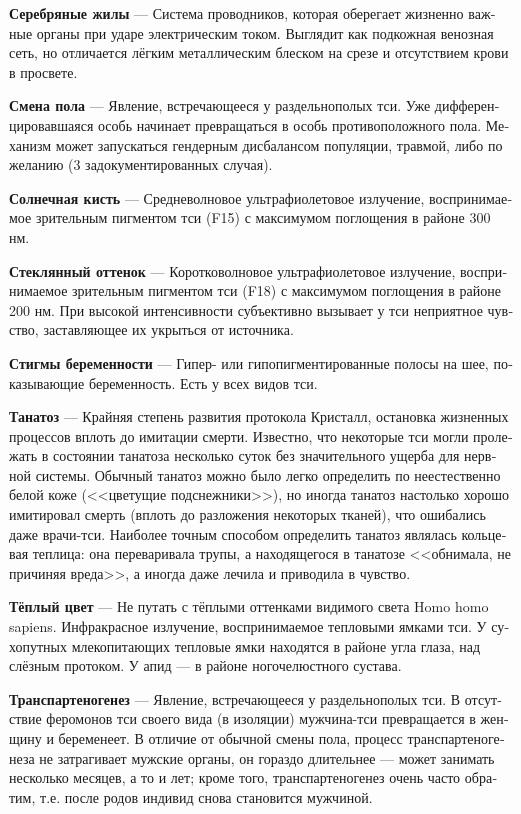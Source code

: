 \documentclass[a4paper,12pt,fleqn]{book}\usepackage{polyglossia}\setdefaultlanguage[babelshorthands=true]{russian}\setotherlanguage{english}\defaultfontfeatures{Ligatures=TeX,Mapping=tex-text}\usepackage{xcolor}\newcommand{\ml}[3]{#2}
\newcommand{\theterm}[3]{\textbf{\hypertarget{#1}{#2}} --- #3}
\begin{document}
\theterm{silver-veins}
{Серебряные жилы}
{Система проводников, которая оберегает жизненно важные органы при ударе электрическим током.
Выглядит как подкожная венозная сеть, но отличается лёгким металлическим блеском на срезе и отсутствием крови в просвете.}

\theterm{gender-switch}
{Смена пола}
{Явление, встречающееся у раздельнополых тси.
Уже дифференцировавшаяся особь начинает превращаться в особь противоположного пола.
Механизм может запускаться гендерным дисбалансом популяции, травмой, либо по желанию (3 задокументированных случая).}

\theterm{sun-touch}
{Солнечная кисть}
{Средневолновое ультрафиолетовое излучение, воспринимаемое зрительным пигментом тси (F15) с максимумом поглощения в районе 300 нм.}

\theterm{glass-hue}
{Стеклянный оттенок}
{Коротковолновое ультрафиолетовое излучение, воспринимаемое зрительным пигментом тси (F18) с максимумом поглощения в районе 200 нм.
При высокой интенсивности субъективно вызывает у тси неприятное чувство, заставляющее их укрыться от источника.}

\theterm{stigmae-of-pregnancy}
{Стигмы беременности}
{Гипер- или гипопигментированные полосы на шее, показывающие беременность.
Есть у всех видов тси.}

\theterm{tanatosis}
{Танатоз}
{Крайняя степень развития протокола Кристалл, остановка жизненных процессов вплоть до имитации смерти.
Известно, что некоторые тси могли пролежать в состоянии танатоза несколько суток без значительного ущерба для нервной системы.
Обычный танатоз можно было легко определить по неестественно белой коже (<<цветущие подснежники>>), но иногда танатоз настолько хорошо имитировал смерть (вплоть до разложения некоторых тканей), что ошибались даже врачи-тси.
Наиболее точным способом определить танатоз являлась кольцевая теплица: она переваривала трупы, а находящегося в танатозе <<обнимала, не причиняя вреда>>, а иногда даже лечила и приводила в чувство.}

\theterm{warm-color}
{Тёплый цвет}
{Не путать с тёплыми оттенками видимого света Homo homo sapiens.
Инфракрасное излучение, воспринимаемое тепловыми ямками тси.
У сухопутных млекопитающих тепловые ямки находятся в районе угла глаза, над слёзным протоком.
У апид --- в районе ногочелюстного сустава.}

\theterm{transpartenogenesis}
{Транспартеногенез}
{Явление, встречающееся у раздельнополых тси.
В отсутствие феромонов тси своего вида (в изоляции) мужчина-тси превращается в женщину и беременеет.
В отличие от обычной смены пола, процесс транспартеногенеза не затрагивает мужские органы, он гораздо длительнее --- может занимать несколько месяцев, а то и лет;
кроме того, транспартеногенез очень часто обратим, т.е. после родов индивид снова становится мужчиной.}
\end{document}
